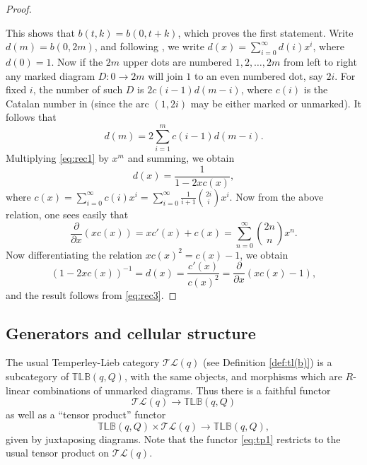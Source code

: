\documentclass[12pt]{amsart}
\theoremstyle{definition}
\theoremstyle{remark}
\numberwithin{equation}{section}
\newcommand{\be}{\begin{equation}}
\newcommand{\ee}{\end{equation}}
\newcommand{\inv}{^{-1}}
\newcommand{\lr}{\longrightarrow}
\newcommand{\TLC}{\mathcal{TL}}
\newcommand{\TLBB}{{\mathbb{TLB}}}
\begin{document}
\begin{proof}
\begin{figure}[h]
\begin{center}
\end{center}
\caption{}\label{fig-4}
\end{figure}

This shows that $b(t,k)=b(0,t+k)$, which proves the first statement. Write $d(m)=b(0,2m)$, and following \cite[\S 4.3]{ILZ1},
we write $d(x)=\sum_{i=0}^\infty d(i)x^i$, where $d(0)=1$. Now if the $2m$ upper dots are numbered $1,2,\dots, 2m$
from left to right any marked diagram $D:0\lr 2m$ will join $1$ to an even numbered dot, say $2i$. For fixed $i$, the number
of such $D$ is $2c(i-1)d(m-i)$, where $c(i)$ is the Catalan number in \cite{ILZ1} (since the arc $(1,2i)$ may be either
marked or unmarked). It follows that 
\be\label{eq:rec1}
d(m)=2\sum_{i=1}^m c(i-1)d(m-i).
\ee
Multiplying \eqref{eq:rec1} by $x^m$ and summing, we obtain
\be\label{eq:rec2}
d(x)=\frac{1}{1-2xc(x)},
\ee
where $c(x)=\sum_{i=0}^\infty c(i)x^i=\sum_{i=0}^\infty \frac{1}{i+1}\binom{2i}{i}x^i$.
Now from the above relation, one sees easily that
\be\label{eq:rec3}
\frac{\partial}{\partial x}(xc(x))=xc'(x)+c(x)=\sum_{n=0}^\infty \binom{2n}{n}x^n.
\ee
Now differentiating the relation $xc(x)^2=c(x)-1$, we obtain 
\[
(1-2xc(x))\inv=d(x)=\frac{c'(x)}{c(x)^2}=\frac{\partial}{\partial x}(xc(x)-1),
\]
and the result follows from \eqref{eq:rec3}.
\end{proof}

\subsection{Generators and cellular structure} \label{ss:tlbb}
The usual Temperley-Lieb category $\TLC(q)$ (see Definition \ref{def:tl(b)}) is a subcategory of $\TLBB(q,Q)$, with the same objects, and morphisms
which are $R$-linear combinations of unmarked diagrams. Thus there is a faithful functor 
\[
\TLC(q)\lr\TLBB(q,Q)
\] 
as well as a ``tensor product'' functor
\be\label{eq:tp1}
\TLBB(q,Q)\times \TLC(q)\lr\TLBB(q,Q),
\ee
given by juxtaposing diagrams. Note that the functor \eqref{eq:tp1} restricts to the usual tensor product on $\TLC(q)$.
\end{document}
